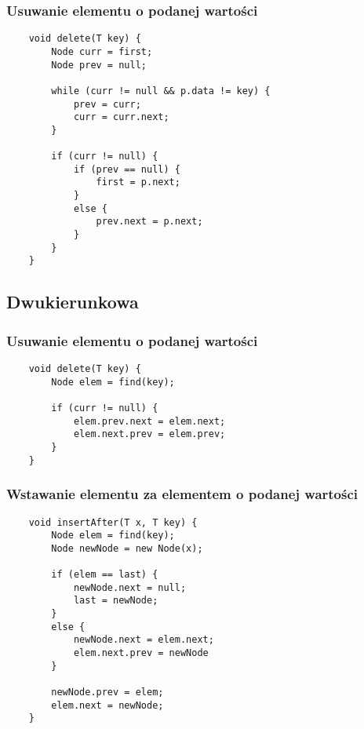 \documentclass[../algorytmy.tex]{subfiles}
\begin{document}
    \pagebreak
    \subsubsection{Usuwanie elementu o podanej wartości}
    \begin{verbatim}
    void delete(T key) {
        Node curr = first;
        Node prev = null;

        while (curr != null && p.data != key) {
            prev = curr;
            curr = curr.next;
        }

        if (curr != null) {
            if (prev == null) {
                first = p.next;
            }
            else {
                prev.next = p.next;
            }
        }
    }
    \end{verbatim}

    \subsection{Dwukierunkowa}
    \subsubsection{Usuwanie elementu o podanej wartości}
    \begin{verbatim}
    void delete(T key) {
        Node elem = find(key);

        if (curr != null) {
            elem.prev.next = elem.next;
            elem.next.prev = elem.prev;
        }
    }
    \end{verbatim}

    \subsubsection{Wstawanie elementu za elementem o podanej wartości}
    \begin{verbatim}
    void insertAfter(T x, T key) {
        Node elem = find(key);
        Node newNode = new Node(x);

        if (elem == last) {
            newNode.next = null;
            last = newNode;
        }
        else {
            newNode.next = elem.next;
            elem.next.prev = newNode
        }

        newNode.prev = elem;
        elem.next = newNode;
    }
    \end{verbatim}
\end{document}

